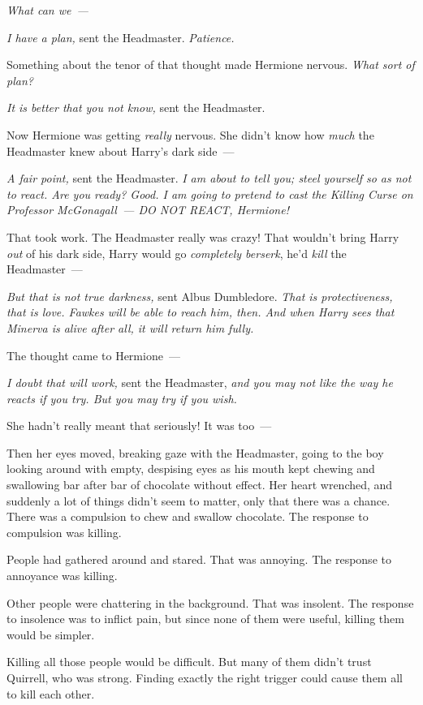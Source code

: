 \emph{What can we~--- }

\emph{I have a plan,} sent the Headmaster. \emph{Patience.}

Something about the tenor of that thought made Hermione nervous. \emph{What
sort of plan?}

\emph{It is better that you not know,} sent the Headmaster.

Now Hermione was getting \emph{really} nervous. She didn't know how \emph{much}
the Headmaster knew about Harry's dark side~---

\emph{A fair point,} sent the Headmaster. \emph{I am about to tell you; steel
yourself so as not to react. Are you ready? Good. I am going to pretend to cast
the Killing Curse on Professor McGonagall~--- DO NOT REACT, Hermione!}

That took work. The Headmaster really was crazy! That wouldn't bring Harry
\emph{out} of his dark side, Harry would go \emph{completely berserk}, he'd
\emph{kill} the Headmaster~---

\emph{But that is not true darkness,} sent Albus Dumbledore. \emph{That is
protectiveness, that is love. Fawkes will be able to reach him, then. And when
Harry sees that Minerva is alive after all, it will return him fully.}

The thought came to Hermione~---

\emph{I doubt that will work,} sent the Headmaster, \emph{and you may not like
the way he reacts if you try. But you may try if you wish.}

She hadn't really meant that seriously! It was too~---

Then her eyes moved, breaking gaze with the Headmaster, going to the boy
looking around with empty, despising eyes as his mouth kept chewing and
swallowing bar after bar of chocolate without effect. Her heart wrenched, and
suddenly a lot of things didn't seem to matter, only that there was a chance.
\sbreak
There was a compulsion to chew and swallow chocolate. The response to
compulsion was killing.

People had gathered around and stared. That was annoying. The response to
annoyance was killing.

Other people were chattering in the background. That was insolent. The response
to insolence was to inflict pain, but since none of them were useful, killing
them would be simpler.

Killing all those people would be difficult. But many of them didn't trust
Quirrell, who was strong. Finding exactly the right trigger could cause them
all to kill each other.

